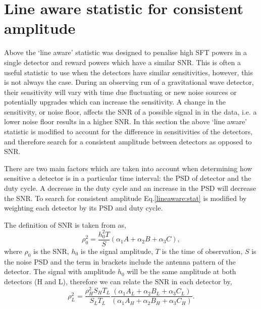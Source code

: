 \section{\label{viterbi:lineawareamp}Line aware statistic for consistent amplitude}


Above the `line aware' statistic was designed to penalise high \ac{SFT} powers in a single detector and reward powers which have a similar \ac{SNR}. This is often a useful statistic to use when the detectors have similar sensitivities, however, this is not always the case. During an observing run of a gravitational wave detector, their sensitivity will vary with time due fluctuating or new noise sources or potentially upgrades which can increase the sensitivity. A change in the sensitivity, or noise floor, affects the \ac{SNR} of a possible signal in in the data, i.e. a lower noise floor results in a higher \ac{SNR}. 
In this section the above `line aware' statistic is modified to account for the difference in sensitivities of the detectors, and therefore search for a consistent amplitude between detectors as opposed to \ac{SNR}.

There are two main factors which are taken into account when determining how sensitive a detector is in a particular time interval: the \ac{PSD} of detector and the duty cycle. A decrease in the duty cycle and an increase in the \ac{PSD} will decrease the \ac{SNR}. To search for consistent amplitude Eq.\ref{lineaware:stat} is modified by weighting each detector by its \ac{PSD} and duty cycle.

The definition of \ac{SNR} is taken from \cite{} as, 
\begin{equation}
    \rho_0^2 = \frac{h_0^2 T}{S}(\alpha_1A + \alpha_2B + \alpha_3C),
\end{equation}
where $\rho_0$ is the \ac{SNR}, $h_0$ is the signal amplitude, $T$ is the time of observation, $S$ is the noise \ac{PSD} and the term in brackets include the antenna pattern of the detector. 
The signal with amplitude $h_0$ will be the same amplitude at both detectors (H and L), therefore we can relate the \ac{SNR} in each detector by,
\begin{equation}
\label{lineawareamp:snrequate}
    \rho_L^2 = \frac{\rho_H^2 S_H T_L}{S_L T_L} \frac{(\alpha_1A_L + \alpha_2B_L + \alpha_3C_L)}{(\alpha_1A_H + \alpha_2B_H + \alpha_3C_H)} .
\end{equation}

